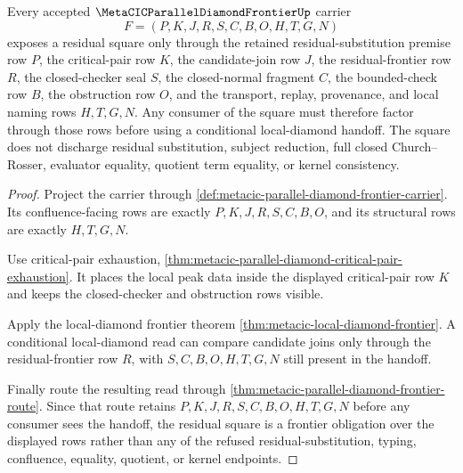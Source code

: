 \begin{theorem}
\label{thm:metacic-parallel-diamond-frontier-residual-square}
Every accepted $\MetaCICParallelDiamondFrontierUp$ carrier
$$
F=(P,K,J,R,S,C,B,O,H,T,G,N)
$$
exposes a residual square only through the retained residual-substitution premise row $P$, the critical-pair row $K$, the candidate-join row $J$, the residual-frontier row $R$, the closed-checker seal $S$, the closed-normal fragment $C$, the bounded-check row $B$, the obstruction row $O$, and the transport, replay, provenance, and local naming rows $H,T,G,N$. Any consumer of the square must therefore factor through those rows before using a conditional local-diamond handoff. The square does not discharge residual substitution, subject reduction, full closed Church--Rosser, evaluator equality, quotient term equality, or kernel consistency.
\end{theorem}
\begin{proof}
Project the carrier through \autoref{def:metacic-parallel-diamond-frontier-carrier}. Its confluence-facing rows are exactly $P,K,J,R,S,C,B,O$, and its structural rows are exactly $H,T,G,N$.

Use critical-pair exhaustion, \autoref{thm:metacic-parallel-diamond-critical-pair-exhaustion}. It places the local peak data inside the displayed critical-pair row $K$ and keeps the closed-checker and obstruction rows visible.

Apply the local-diamond frontier theorem \autoref{thm:metacic-local-diamond-frontier}. A conditional local-diamond read can compare candidate joins only through the residual-frontier row $R$, with $S,C,B,O,H,T,G,N$ still present in the handoff.

Finally route the resulting read through \autoref{thm:metacic-parallel-diamond-frontier-route}. Since that route retains $P,K,J,R,S,C,B,O,H,T,G,N$ before any consumer sees the handoff, the residual square is a frontier obligation over the displayed rows rather than any of the refused residual-substitution, typing, confluence, equality, quotient, or kernel endpoints.
\end{proof}

